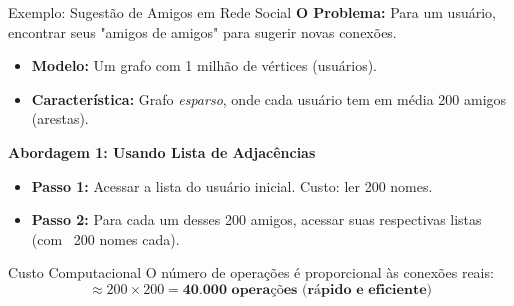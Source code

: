 \begin{frame}{Exemplo: Sugestão de Amigos em Rede Social}
    \textbf{O Problema:} Para um usuário, encontrar seus "amigos de amigos" para sugerir novas conexões.
    
    \pause %
    
    \begin{itemize}
        \item \textbf{Modelo:} Um grafo com 1 milhão de vértices (usuários).
        \item \textbf{Característica:} Grafo \textit{esparso}, onde cada usuário tem em média 200 amigos (arestas).
    \end{itemize}
    
    \pause %
    
    \textbf{Abordagem 1: Usando Lista de Adjacências}
    \begin{itemize}
        \item<+-> \textbf{Passo 1:} Acessar a lista do usuário inicial. Custo: ler 200 nomes.
        \item<+-> \textbf{Passo 2:} Para cada um desses 200 amigos, acessar suas respectivas listas (com ~200 nomes cada).
    \end{itemize}
    
    \pause %
    
    \begin{block}{Custo Computacional}
        O número de operações é proporcional às conexões reais:
        $$ \approx 200 \times 200 = \textbf{40.000 operações (rápido e eficiente)} $$
    \end{block}

\end{frame}

